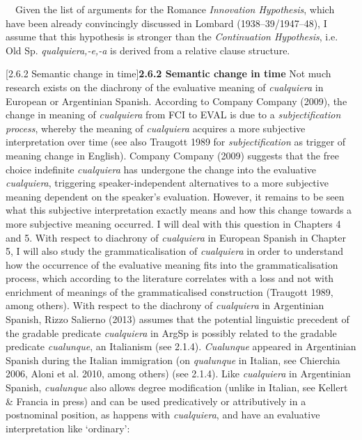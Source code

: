\documentclass[10pt]{article}
\makeatletter
\renewcommand\subsubsection{\@startsection{subsubsection}{3}{0.0cm}{0in}{0.1mm}{\normalfont\normalsize\fontsize{12pt}{14.4pt}\selectfont}}
\newenvironment{styleStandard}{\renewcommand\baselinestretch{1.25}\setlength\leftskip{0cm}\setlength\rightskip{0cm}\setlength\parindent{0cm}\setlength\parfillskip{0pt plus 1fil}\setlength\parskip{0in plus 1pt}\writerlistparindent\writerlistleftskip\leavevmode\normalfont\normalsize\fontsize{12pt}{14.4pt}\selectfont\writerlistlabel\ignorespaces}{\unskip\vspace{0in plus 1pt}\par}
\newcommand\writerlistleftskip{}
\newcommand\writerlistparindent{}
\newcommand\writerlistlabel{}
\makeatother
\begin{document}
\begin{styleStandard}
\ \ Given the list of arguments for the Romance \textit{Innovation Hypothesis}, which have been already convincingly discussed in Lombard (1938–39/1947–48), I assume that this hypothesis is stronger than the \textit{Continuation Hypothesis}, i.e. Old Sp.\textbf{\textit{ }}\textit{qualquiera,-e,-a}\textbf{ }is derived from a relative clause structure.
\end{styleStandard}

\subsubsection[2.6.2 Semantic change in time]{\textbf{2.6.2 Semantic change in time}}
\begin{styleStandard}
Not much research exists on the diachrony of the evaluative meaning of \textit{cualquiera} in European or Argentinian Spanish. According to Company Company (2009), the change in meaning of \textit{cualquiera} from FCI to EVAL is due to a \textit{subjectification process}, whereby the meaning of \textit{cualquiera} acquires a more subjective interpretation over time (see also Traugott 1989 for \textit{subjectification} as trigger of meaning change in English). Company Company (2009) suggests that the free choice indefinite \textit{cualquiera} has undergone the change into the evaluative \textit{cualquiera}, triggering speaker-independent alternatives to a more subjective meaning dependent on the speaker’s evaluation. However, it remains to be seen what this subjective interpretation exactly means and how this change towards a more subjective meaning occurred. I will deal with this question in Chapters 4 and 5. With respect to diachrony of \textit{cualquiera} in European Spanish in Chapter 5, I will also study the grammaticalisation of \textit{cualquiera} in order to understand how the occurrence of the evaluative meaning fits into the grammaticalisation process, which according to the literature correlates with a loss and not with enrichment of meanings of the grammaticalised construction (Traugott 1989, among others). With respect to the diachrony of \textit{cualquiera} in Argentinian Spanish, Rizzo Salierno (2013) assumes that the potential linguistic precedent of the gradable predicate \textit{cualquiera} in ArgSp is possibly related to the gradable predicate \textit{cualunque}, an Italianism (see 2.1.4). \textit{Cualunque} appeared in Argentinian Spanish during the Italian immigration (on \textit{qualunque} in Italian, see Chierchia 2006, Aloni et al. 2010, among others) (see 2.1.4). Like \textit{cualquiera} in Argentinian Spanish, \textit{cualunque} also allows degree modification (unlike in Italian, see Kellert \& Francia in press) and can be used predicatively or attributively in a postnominal position, as happens with \textit{cualquiera}, and have an evaluative interpretation like ‘ordinary’:
\end{styleStandard}
\end{document}
